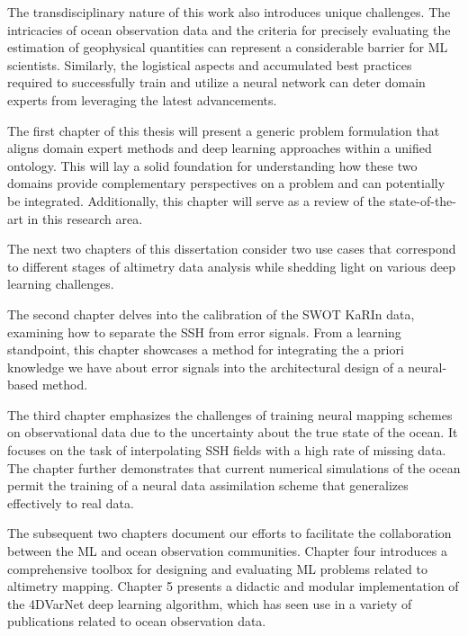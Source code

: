 \begin{bibunit}
The transdisciplinary nature of this work also introduces unique challenges. The intricacies of ocean observation data and the criteria for precisely evaluating the estimation of geophysical quantities can represent a considerable barrier for ML scientists. Similarly, the logistical aspects and accumulated best practices required to successfully train and utilize a neural network can deter domain experts from leveraging the latest advancements.

The first chapter of this thesis will present a generic problem formulation that aligns domain expert methods and deep learning approaches within a unified ontology. This will lay a solid foundation for understanding how these two domains provide complementary perspectives on a problem and can potentially be integrated. Additionally, this chapter will serve as a review of the state-of-the-art in this research area.

The next two chapters of this dissertation consider two use cases that correspond to different stages of altimetry data analysis while shedding light on various deep learning challenges.

The second chapter delves into the calibration of the SWOT KaRIn data, examining how to separate the SSH from error signals. From a learning standpoint, this chapter showcases a method for integrating the a priori knowledge we have about error signals into the architectural design of a neural-based method.

The third chapter emphasizes the challenges of training neural mapping schemes on observational data due to the uncertainty about the true state of the ocean. It focuses on the task of interpolating SSH fields with a high rate of missing data. The chapter further demonstrates that current numerical simulations of the ocean permit the training of a neural data assimilation scheme that generalizes effectively to real data.

The subsequent two chapters document our efforts to facilitate the collaboration between the ML and ocean observation communities. Chapter four introduces a comprehensive toolbox for designing and evaluating ML problems related to altimetry mapping. Chapter 5 presents a didactic and modular implementation of the 4DVarNet deep learning algorithm, which has seen use in a variety of publications related to ocean observation data.



\end{bibunit}
